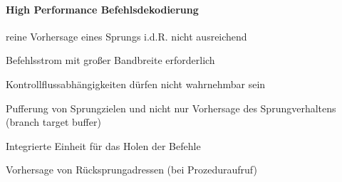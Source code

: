 \documentclass[10pt,landscape]{article}
\begin{document}
\begin{multicols}{3}
  \paragraph{High Performance Befehlsdekodierung}
  reine Vorhersage eines Sprungs i.d.R. nicht ausreichend
  \begin{itemize*}
    \item Befehlsstrom mit großer Bandbreite erforderlich
    \item Kontrollflussabhängigkeiten dürfen nicht wahrnehmbar sein 
    \item Pufferung von Sprungzielen und nicht nur Vorhersage des Sprungverhaltens (branch target buffer)
    \item Integrierte Einheit für das Holen der Befehle
    \item Vorhersage von Rücksprungadressen (bei Prozeduraufruf)
  \end{itemize*}
  

\end{multicols}
\end{document}
